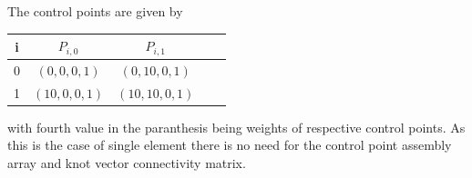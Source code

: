 \documentclass[12pt]{article}
\begin{document}
The control points are given by
\begin{center}
	\begin{tabular}{ |c|c|c|c|c| } 
		\hline
		i & $ P_{i,0} $ & $ P_{i,1} $  \\ \hline
		0 & $ (0,0,0,1) $ & $ (0,10,0,1) $  \\ \hline
		1 & $ (10,0,0,1) $ & $ (10,10,0,1) $  \\ \hline

	\end{tabular}
\end{center}
with fourth value in the paranthesis being weights of respective control points.
As this is the case of single element there is no need for the control point assembly array and knot vector connectivity matrix.









\noindent


\end{document}
